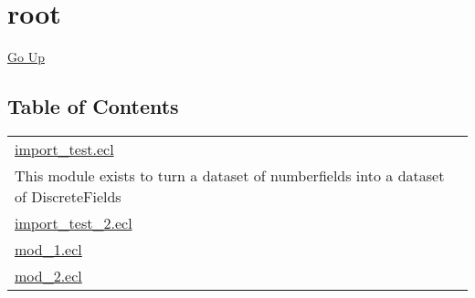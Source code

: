 \chapter*{\color{headtoc} root}
\hypertarget{ecldoc:toc:root}{}
\hyperlink{ecldoc:toc:}{Go Up}


\section*{Table of Contents}
{\renewcommand{\arraystretch}{1.5}
\begin{longtable}{|p{\textwidth}|}
\hline
\hyperlink{ecldoc:toc:import_test}{import\_test.ecl} \\
This module exists to turn a dataset of numberfields into a dataset of DiscreteFields \\
\hline
\hyperlink{ecldoc:toc:import_test_2}{import\_test\_2.ecl} \\
\hline
\hyperlink{ecldoc:toc:mod_1}{mod\_1.ecl} \\
\hline
\hyperlink{ecldoc:toc:mod_2}{mod\_2.ecl} \\
\hline
\end{longtable}
}





